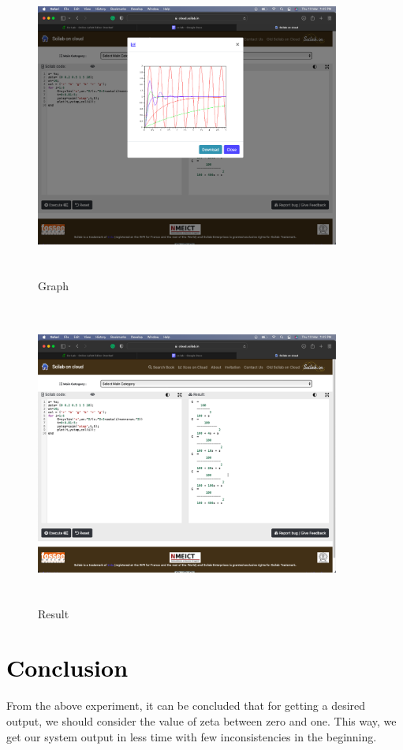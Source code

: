 \documentclass[12pt]{article}
\begin{document}
\begin{figure}[!hth]
        \centering
        \includegraphics[width =10cm, height = 10cm]{images/exp121.png}
        \caption{Graph}
        \label{Graph}
\end{figure}
\begin{figure}[!hth]
        \centering
        \includegraphics[width =10cm, height = 10cm]{images/exp122.png}
        \caption{Result}
        \label{Result}
\end{figure}

\section*{\textcolor{black}{Conclusion}}
From the above experiment, it can be concluded that for getting a desired output, we should consider the value of zeta between zero and one. This way, we get our system output in less time with few inconsistencies in the beginning.
 \pagebreak
\end{document}
